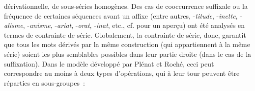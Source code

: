 \documentclass[output=paper]{langsci/langscibook}
\begin{document}
dérivationnelle, de sous-séries homogènes. Des cas de cooccurrence
suffixale ou la fréquence de certaines séquences avant un affixe %
(entre autres, -\emph{titude}, -\emph{inette}, -\emph{alisme}, -\emph{anisme}, -\emph{ariat}, -\emph{orat}, -\emph{inat}, etc., cf. %
\citealt{Plenat-Roche2014} %
%
pour un aperçu) 
%
ont été analysés en termes de contrainte de série.
Globalement, la contrainte de série, donc, garantit que tous les mots
dérivés par la même construction (qui appartiennent à la même série)
soient les plus semblables possibles dans leur partie droite (dans le
cas de la suffixation). Dans le modèle développé par Plénat et Roché,
ceci peut correspondre au moins à deux types d'opérations, qui à leur
tour peuvent être réparties en sous-groupes~:
\end{document}

